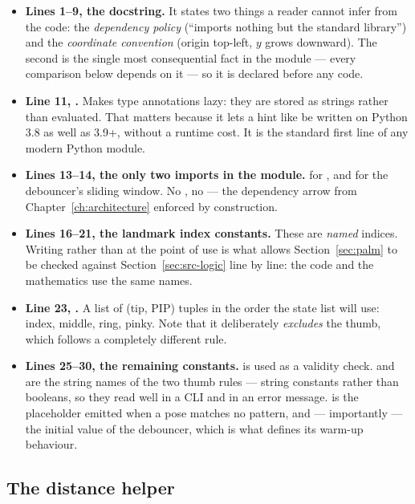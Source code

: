\begin{itemize}
  \item \textbf{Lines 1--9, the docstring.} It states two things a reader cannot infer from the code:
        the \emph{dependency policy} (``imports nothing but the standard library'') and the
        \emph{coordinate convention} (origin top-left, $y$ grows downward). The second is the single
        most consequential fact in the module --- every comparison below depends on it --- so it is
        declared before any code.
  \item \textbf{Line 11, .} Makes type annotations lazy:
        they are stored as strings rather than evaluated. That matters because it lets a hint like
         be written on Python 3.8 as well as 3.9+, without a runtime cost. It is the
        standard first line of any modern Python module.
  \item \textbf{Lines 13--14, the only two imports in the module.}  for ,
        and  for the debouncer's sliding window. No , no  ---
        the dependency arrow from Chapter~\ref{ch:architecture} enforced by construction.
  \item \textbf{Lines 16--21, the landmark index constants.} These are \emph{named} indices. Writing
         rather than  at the point of use is what allows
        Section~\ref{sec:palm} to be checked against Section~\ref{sec:src-logic} line by line: the
        code and the mathematics use the same names.
  \item \textbf{Line 23, .} A list of (tip, PIP) tuples in the order the state
        list will use: index, middle, ring, pinky. Note that it deliberately \emph{excludes} the
        thumb, which follows a completely different rule.
  \item \textbf{Lines 25--30, the remaining constants.}  is used as a
        validity check.  and  are the string names of the two
        thumb rules --- string constants rather than booleans, so they read well in a CLI and in an
        error message.  is the placeholder emitted when a pose matches no pattern,
        and --- importantly --- the initial value of the debouncer, which is what defines its
        warm-up behaviour.
\end{itemize}

\subsection{The distance helper}

